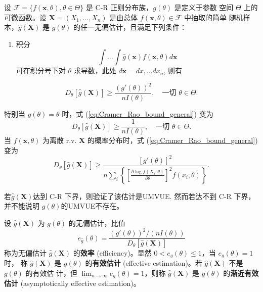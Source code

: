 \begin{theorem}[C-R不等式]\label{thm:Cramer_Rao_inequality}
    设 $\mathcal{F}=\{f(\mathbf{x}, \theta), \theta \in \Theta\}$ 是 C-R 正则分布族，$g(\theta)$ 是定义于参数
空间 $\Theta$ 上的可微函数。设 $\mathbf{X}=(X_1, \dots, X_n)$ 是由总体 $f(\mathbf{x}, \theta) \in \mathcal{F}$ 中抽取的简单
随机样本，$\hat{g}(\mathbf{X})$ 是 $g(\theta)$ 的任一无偏估计，且满足下列条件：
\begin{enumerate}
    \item 积分 
    $$\int \dots \int \hat{g}(\mathbf{x})f(\mathbf{x}, \theta)d\mathbf{x}$$
    可在积分号下对 $\theta$ 求导数，此处 $d\mathbf{x} = dx_1 \dots dx_n$, 则有
\end{enumerate}
\begin{equation}
D_\theta[\hat{g}(\mathbf{X})] \ge \frac{(g'(\theta))^2}{nI(\theta)}, \quad \text{一切 } \theta \in \Theta. \label{eq:Cramer_Rao_bound_general}
\end{equation}
\end{theorem}
\begin{remark}
    特别当 $g(\theta) = \theta$ 时，式 (\ref{eq:Cramer_Rao_bound_general}) 变为
\begin{equation}
D_\theta[\hat{g}(\mathbf{X})] \ge \frac{1}{nI(\theta)}, \quad \text{一切 } \theta \in \Theta. \label{eq:Cramer_Rao_bound_theta}
\end{equation}
当 $f(\mathbf{x}, \theta)$ 为离散 r.v. $\mathbf{X}$ 的概率分布时，式 (\ref{eq:Cramer_Rao_bound_general}) 变为
\begin{equation}
D_\theta[\hat{g}(\mathbf{X})] \ge \frac{[g'(\theta)]^2}{n \sum\limits_{i} \left\{ \left[\frac{\partial \log f(X_i, \theta)}{\partial \theta}\right]^2 f(x_i, \theta) \right\}}. \label{eq:Cramer_Rao_bound_discrete}
\end{equation}
\end{remark}

\begin{remark}
    若$\hat{g}(\mathbf{X})$达到 C-R 下界，则验证了该估计是UMVUE. 然而若达不到 C-R 下界，并不能说明 $g(\theta)$的UMVUE不存在。
\end{remark}

\begin{definition}[无偏估计的效率]\label{def:efficiency}
设 $\hat{g}(\mathbf{X})$ 为 $g(\theta)$ 的无偏估计，比值
\begin{equation}
e_{\hat{g}}(\theta) = \frac{(g'(\theta))^2 / (nI(\theta))}{D_\theta[\hat{g}(\mathbf{X})]} \label{eq:efficiency_ratio}
\end{equation}
称为无偏估计 $\hat{g}(\mathbf{X})$ 的\textbf{效率} (efficiency)。显然 $0 < e_g(\theta) \le 1$，当 $e_g(\theta) = 1$ 时，
称 $\hat{g}(\mathbf{X})$ 是 $g(\theta)$ 的\textbf{有效估计} (effective estimation)。若 $\hat{g}(\mathbf{X})$ 不是 $g(\theta)$ 的有效估
计，但 $\lim_{n\to\infty} e_g(\theta) = 1$，则称 $\hat{g}(\mathbf{X})$ 是 $g(\theta)$ 的\textbf{渐近有效估计} (asymptotically effective
estimation)。
\end{definition}

